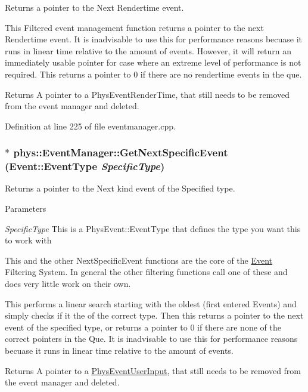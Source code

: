 Returns a pointer to the Next Rendertime event. 

This Filtered event management function returns a pointer to the next Rendertime event. It is inadvisable to use this for performance reasons becuase it runs in linear time relative to the amount of events. However, it will return an immediately usable pointer for case where an extreme level of performance is not required. This returns a pointer to 0 if there are no rendertime events in the que. \begin{DoxyReturn}{Returns}
A pointer to a PhysEventRenderTime, that still needs to be removed from the event manager and deleted. 
\end{DoxyReturn}


Definition at line 225 of file eventmanager.cpp.

\hypertarget{classphys_1_1EventManager_ad0242442d4663b8f2b17824cbf38452b}{
\subsubsection[{GetNextSpecificEvent}]{ $\ast$ phys::EventManager::GetNextSpecificEvent ({\bf Event::EventType} {\em SpecificType})}}
\label{da/dde/classphys_1_1EventManager_ad0242442d4663b8f2b17824cbf38452b}


Returns a pointer to the Next kind event of the Specified type. 


\begin{DoxyParams}{Parameters}
\item[{\em SpecificType}]This is a PhysEvent::EventType that defines the type you want this to work with\end{DoxyParams}
This and the other NextSpecificEvent functions are the core of the \hyperlink{classphys_1_1Event}{Event} Filtering System. In general the other filtering functions call one of these and does very little work on their own. \par
 This performs a linear search starting with the oldest (first entered Events) and simply checks if it the of the correct type. Then this returns a pointer to the next event of the specified type, or returns a pointer to 0 if there are none of the correct pointers in the Que. It is inadvisable to use this for performance reasons becuase it runs in linear time relative to the amount of events. \begin{DoxyReturn}{Returns}
A pointer to a \hyperlink{classPhysEventUserInput}{PhysEventUserInput}, that still needs to be removed from the event manager and deleted. 
\end{DoxyReturn}


